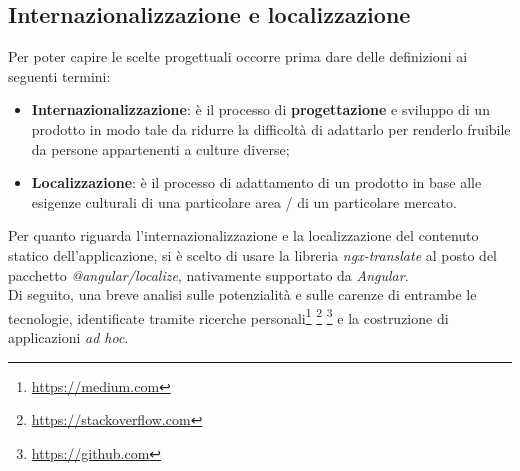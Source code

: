 \subsection{Internazionalizzazione e localizzazione}
\label{subsec:internazionalizzazione}
Per poter capire le scelte progettuali occorre prima dare delle definizioni ai seguenti termini:
\begin{itemize}
    \item \textbf{Internazionalizzazione}: è il processo di \textbf{progettazione} e sviluppo di un prodotto in modo tale da ridurre la difficoltà di adattarlo per renderlo fruibile da persone appartenenti a culture diverse;
    \item \textbf{Localizzazione}: è il processo di adattamento di un prodotto in base alle esigenze culturali di una particolare area / di un particolare mercato.
\end{itemize}
Per quanto riguarda l’internazionalizzazione e la localizzazione del contenuto statico dell’applicazione, si è scelto di usare la libreria \textit{ngx-translate} al posto del pacchetto \textit{@angular/localize}, nativamente supportato da \textit{Angular}. \\
Di seguito, una breve analisi sulle potenzialità e sulle carenze di entrambe le tecnologie, identificate tramite ricerche personali\footnote{\href{https://medium.com/holisticon-consultants/angular-i18n-picking-the-right-tool-for-the-job-b543460801db}{https://medium.com}} \footnote{\href{https://stackoverflow.com/questions/44923138/differences-ngx-translate-vs-i18n}{https://stackoverflow.com}}
\footnote{\href{https://github.com/ngx-translate/core/issues/495}{https://github.com}} e la costruzione di applicazioni \textit{ad hoc}.

